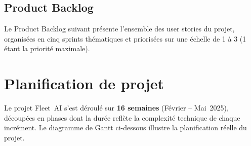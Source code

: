 \subsection{Product Backlog}

Le Product Backlog suivant présente l'ensemble des user stories du projet, organisées en cinq sprints thématiques et priorisées sur une échelle de 1 à 3 (1 étant la priorité maximale).



\section{Planification de projet}

Le projet Fleet~AI s'est déroulé sur \textbf{16 semaines} (Février -- Mai~2025), découpées en phases dont la durée reflète la complexité technique de chaque incrément. Le diagramme de Gantt ci-dessous illustre la planification réelle du projet.




